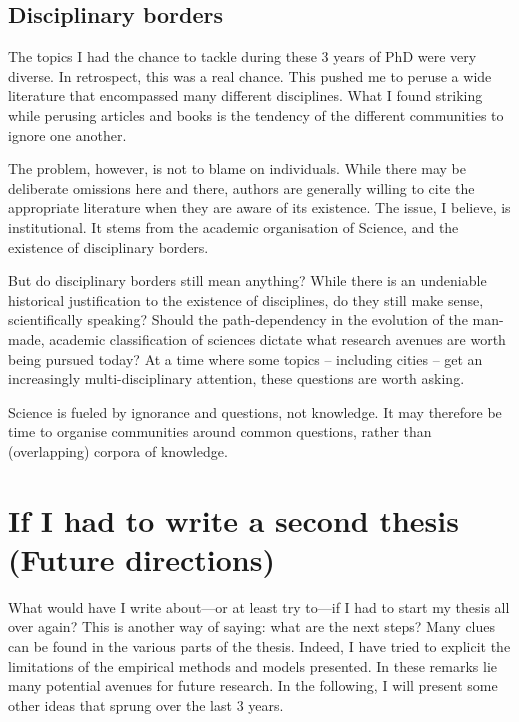 \subsection{Disciplinary borders}
\label{sub:disciplinary_borders}


The topics I had the chance to tackle during these 3 years of PhD were very
diverse. In retrospect, this was a real chance. This pushed me to peruse a wide
literature that encompassed many different disciplines. What I found striking
while perusing articles and books is the tendency of the different communities to
ignore one another. 

The problem, however, is not to blame on individuals. While there may be
deliberate omissions here and there, authors are generally willing to cite the
appropriate literature when they are aware of its existence. The issue, I
believe, is institutional. It stems from the academic organisation of Science,
and the existence of disciplinary borders.

But do disciplinary borders still mean anything? While there is an undeniable
historical justification to the existence of disciplines, do they still make
sense, scientifically speaking? Should the path-dependency in the evolution of
the man-made, academic classification of sciences dictate what research avenues
are worth being pursued today? At a time where some topics -- including cities
-- get an increasingly multi-disciplinary attention, these questions are worth
asking.

Science is fueled by ignorance and questions, not knowledge. It may therefore be
time to organise communities around common questions, rather than (overlapping)
corpora of knowledge.


\section{If I had to write a second thesis (Future directions)}
\label{sec:limitations}

What would have I write about---or at least try to---if I had to start my
thesis all over again? This is another way of saying: what are the next steps?
Many clues can be found in the various parts of the thesis. Indeed, I have tried
to explicit the limitations of the empirical methods and models presented. In
these remarks lie many potential avenues for future research. In the following,
I will present some other ideas that sprung over the last $3$ years.\\

